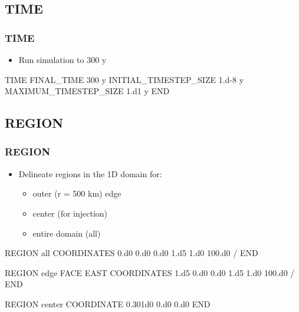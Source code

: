 \documentclass{beamer}
\begin{document}
\subsection{TIME}

\begin{frame}[fragile]\frametitle{TIME}

\begin{itemize}
\item Run simulation to 300 y
\end{itemize}

\begin{semiverbatim}

TIME
  FINAL_TIME 300 y
  INITIAL_TIMESTEP_SIZE 1.d-8 y
  MAXIMUM_TIMESTEP_SIZE 1.d1 y
END

\end{semiverbatim}

\end{frame}

\subsection{REGION}

\begin{frame}\frametitle{REGION}

\begin{itemize}
  \item Delineate regions in the 1D domain for:
  \begin{itemize}
    \item outer (r = 500 km) edge
    \item center (for injection)
    \item entire domain (all)
  \end{itemize}
\end{itemize}

\begin{semiverbatim}
REGION all
  COORDINATES
    0.d0 0.d0 0.d0
    1.d5 1.d0 100.d0
  /
END

\newpage
REGION edge
  FACE EAST
  COORDINATES
    1.d5 0.d0  0.d0
    1.d5 1.d0  100.d0
  /
END

REGION center
  COORDINATE 0.301d0 0.d0 0.d0
END
\end{semiverbatim}

\end{frame}
\end{document}
